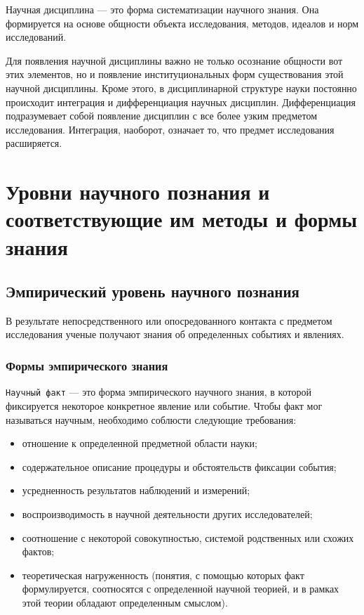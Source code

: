 Научная дисциплина --- это форма систематизации научного знания.
Она формируется на основе общности объекта исследования, методов, идеалов и норм исследований.  

Для появления научной дисциплины важно не только осознание общности вот этих
элементов, но и появление институциональных форм существования этой научной
дисциплины. 
Кроме этого, в дисциплинарной структуре науки постоянно происходит интеграция и
дифференциация научных дисциплин. 
Дифференциация подразумевает собой появление дисциплин с все более узким предметом
исследования. 
Интеграция, наоборот, означает то, что предмет исследования
расширяется.


\section{Уровни научного познания и соответствующие им методы и формы знания}
 
\subsection{Эмпирический уровень научного познания}

В результате непосредственного или опосредованного контакта с
предметом исследования ученые получают знания об определенных событиях и явлениях. 

\subsubsection{Формы эмпирического знания}

\texttt{Научный факт} --- это форма эмпирического научного знания, в которой фиксируется
некоторое конкретное явление или событие. 
Чтобы факт мог называться научным, необходимо соблюсти следующие требования:
\begin{itemize}
    \item отношение к определенной предметной области науки; 
    \item содержательное описание процедуры и  обстоятельств фиксации события;
    \item усредненность результатов наблюдений и измерений; 
    \item воспроизводимость в научной деятельности  других  исследователей;  
    \item соотношение  с  некоторой  совокупностью, системой родственных или схожих фактов;
    \item теоретическая нагруженность (понятия, с помощью
    которых факт формулируется, соотносятся с определенной научной теорией, и в
    рамках этой теории обладают определенным смыслом).
\end{itemize}

